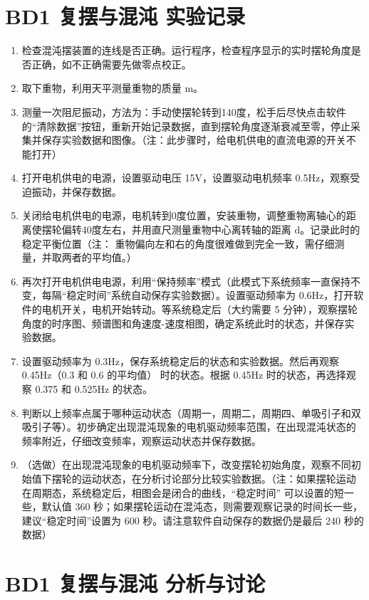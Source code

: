 \section{BD1 复摆与混沌  \quad 实验记录}
\begin{enumerate}
	\item 检查混沌摆装置的连线是否正确。运行程序，检查程序显示的实时摆轮角度是否正确，如不正确需要先做零点校正。
	\item 取下重物，利用天平测量重物的质量 m。
	\item 测量一次阻尼振动，方法为：手动使摆轮转到140度，松手后尽快点击软件的“清除数据”按钮，重新开始记录数据，直到摆轮角度逐渐衰减至零，停止采集并保存实验数据和图像。（注：此步骤时，给电机供电的直流电源的开关不能打开）
	\item 打开电机供电的电源，设置驱动电压 15V，设置驱动电机频率 0.5Hz，观察受迫振动，并保存数据。
	\item 关闭给电机供电的电源，电机转到0度位置，安装重物，调整重物离轴心的距离使摆轮偏转40度左右，并用直尺测量重物中心离转轴的距离 d。记录此时的稳定平衡位置（注： 重物偏向左和右的角度很难做到完全一致，需仔细测量，并取两者的平均值。）
	\item 再次打开电机供电电源，利用“保持频率”模式（此模式下系统频率一直保持不变，每隔“稳定时间”系统自动保存实验数据）。设置驱动频率为 0.6Hz，打开软件的电机开关，电机开始转动。等系统稳定后（大约需要 5 分钟），观察摆轮角度的时序图、频谱图和角速度-速度相图，确定系统此时的状态，并保存实验数据。 
	\item 设置驱动频率为 0.3Hz，保存系统稳定后的状态和实验数据。然后再观察 0.45Hz（0.3 和 0.6 的平均值） 时的状态。根据 0.45Hz 时的状态，再选择观察 0.375 和 0.525Hz 的状态。
	\item 判断以上频率点属于哪种运动状态（周期一，周期二，周期四、单吸引子和双吸引子等）。初步确定出现混沌现象的电机驱动频率范围，在出现混沌状态的频率附近，仔细改变频率，观察运动状态并保存数据。 
	\item （选做）在出现混沌现象的电机驱动频率下，改变摆轮初始角度，观察不同初始值下摆轮的运动状态，在分析讨论部分比较实验数据。（注：如果摆轮运动在周期态，系统稳定后，相图会是闭合的曲线，“稳定时间” 可以设置的短一些，默认值 360 秒；如果摆轮运动在混沌态，则需要观察记录的时间长一些，建议“稳定时间”设置为 600 秒。请注意软件自动保存的数据仍是最后 240 秒的数据）
\end{enumerate}	

\clearpage
\section{BD1 复摆与混沌 \quad 分析与讨论}
